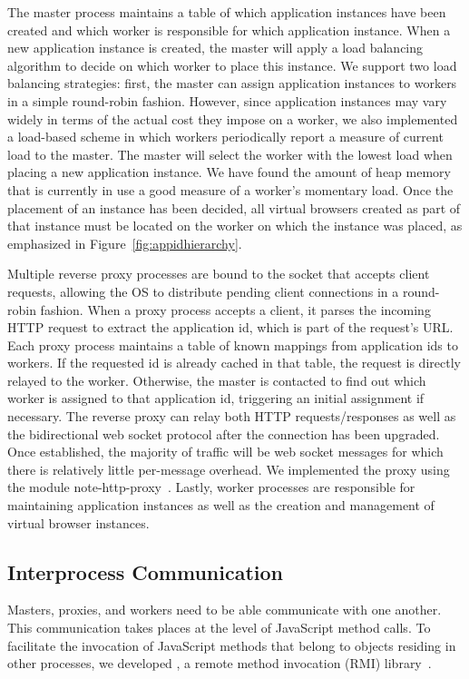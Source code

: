 The master process maintains a table of which application instances have been created and which
worker is responsible for which application instance.  When a new application instance is created,
the master will apply a load balancing algorithm to decide on which worker to place this instance.  
We support two load balancing strategies: first, the master can assign application instances
to workers in a simple round-robin fashion.  However, since application instances may vary
widely in terms of the actual cost they impose on a worker, we also implemented a load-based
scheme in which workers periodically report a measure of current load to the master.
The master will select the worker with the lowest load when placing a new application instance.
We have found the amount of heap memory that is currently in use a good measure of a worker's 
momentary load.  Once the placement of an instance has been decided, all
virtual browsers created as part of that instance must be located on the worker on which the instance
was placed, as emphasized in Figure~\ref{fig:appidhierarchy}.

Multiple reverse proxy processes are bound to the socket that accepts client requests, allowing
the OS to distribute pending client connections in a round-robin fashion.  
When a proxy process accepts a client, it parses the incoming HTTP request to extract the application
id, which is part of the request's URL.  Each proxy process maintains a table of known mappings from 
application ids to workers.  If the requested id is already cached in that table, the request is directly
relayed to the worker.  Otherwise, the master is contacted to find out which worker is assigned
to that application id, triggering an initial assignment if necessary.  The reverse proxy can 
relay both HTTP requests/responses as well as the bidirectional web socket protocol after the
connection has been upgraded.  Once established, the majority of traffic will be web socket
messages for which there is relatively little per-message overhead.  We implemented the proxy 
using the \nodejs{} module note-http-proxy~\cite{nodeproxy}.
Lastly, worker processes are responsible for maintaining application instances as well as the
creation and management of virtual browser instances.


\subsection{Interprocess Communication}
Masters, proxies, and workers need to be able communicate with one another. 
This communication takes places at the level of JavaScript method calls.
To facilitate the invocation of JavaScript methods that belong to objects residing 
in other processes, we developed \nodermi, a remote method invocation (RMI) 
library~\cite{nodermi}.

